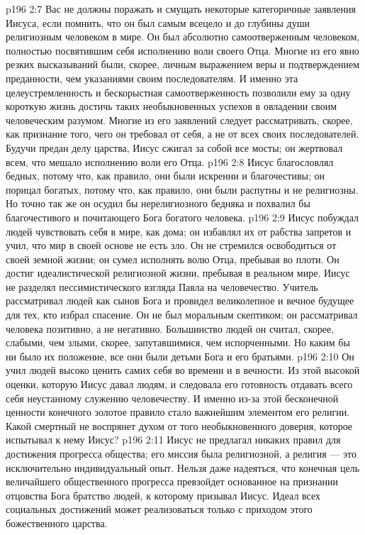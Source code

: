 \vs p196 2:7 Вас не должны поражать и смущать некоторые категоричные заявления Иисуса, если помнить, что он был самым всецело и до глубины души религиозным человеком в мире. Он был абсолютно самоотверженным человеком, полностью посвятившим себя исполнению воли своего Отца. Многие из его явно резких высказываний были, скорее, личным выражением веры и подтверждением преданности, чем указаниями своим последователям. И именно эта целеустремленность и бескорыстная самоотверженность позволили ему за одну короткую жизнь достичь таких необыкновенных успехов в овладении своим человеческим разумом. Многие из его заявлений следует рассматривать, скорее, как признание того, чего он требовал от себя, а не от всех своих последователей. Будучи предан делу царства, Иисус сжигал за собой все мосты; он жертвовал всем, что мешало исполнению воли его Отца.
\vs p196 2:8 Иисус благословлял бедных, потому что, как правило, они были искренни и благочестивы; он порицал богатых, потому что, как правило, они были распутны и не религиозны. Но точно так же он осудил бы нерелигиозного бедняка и похвалил бы благочестивого и почитающего Бога богатого человека.
\vs p196 2:9 Иисус побуждал людей чувствовать себя в мире, как дома; он избавлял их от рабства запретов и учил, что мир в своей основе не есть зло. Он не стремился освободиться от своей земной жизни; он сумел исполнять волю Отца, пребывая во плоти. Он достиг идеалистической религиозной жизни, пребывая в реальном мире. Иисус не разделял пессимистического взгляда Павла на человечество. Учитель рассматривал людей как сынов Бога и провидел великолепное и вечное будущее для тех, кто избрал спасение. Он не был моральным скептиком; он рассматривал человека позитивно, а не негативно. Большинство людей он считал, скорее, слабыми, чем злыми, скорее, запутавшимися, чем испорченными. Но каким бы ни было их положение, все они были детьми Бога и его братьями.
\vs p196 2:10 Он учил людей высоко ценить самих себя во времени и в вечности. Из этой высокой оценки, которую Иисус давал людям, и следовала его готовность отдавать всего себя неустанному служению человечеству. И именно из\hyp{}за этой бесконечной ценности конечного золотое правило стало важнейшим элементом его религии. Какой смертный не воспрянет духом от того необыкновенного доверия, которое испытывал к нему Иисус?
\vs p196 2:11 Иисус не предлагал никаких правил для достижения прогресса общества; его миссия была религиозной, а религия --- это исключительно индивидуальный опыт. Нельзя даже надеяться, что конечная цель величайшего общественного прогресса превзойдет основанное на признании отцовства Бога братство людей, к которому призывал Иисус. Идеал всех социальных достижений может реализоваться только с приходом этого божественного царства.
